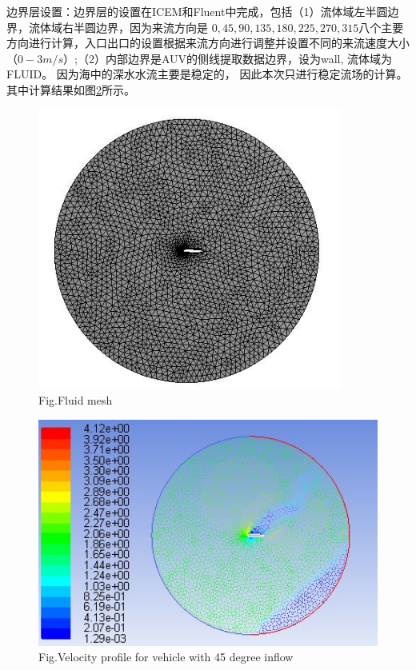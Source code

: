 边界层设置：边界层的设置在ICEM和Fluent中完成，包括（1）流体域左半圆边界，流体域右半圆边界，因为来流方向是 $0, 45, 90, 135, 180, 225, 270,315$八个主要方向进行计算，入口出口的设置根据来流方向进行调整并设置不同的来流速度大小（$0-3 m/s$）;（2）内部边界是AUV的侧线提取数据边界，设为wall, 流体域为FLUID。 因为海中的深水水流主要是稳定的， 因此本次只进行稳定流场的计算。其中计算结果如图\ref{fig:chap3:F12}所示。

    \begin{figure}[!htp]
    \centering
        \includegraphics[width=10cm]{figure/chap3/fig4.jpg}
        \label{fig:chap3:F11}
         {Fig.}{Fluid mesh }
    \end{figure}

    \begin{figure}[!htp]
    \centering
        \includegraphics[width=13cm]{figure/chap3/fig5.jpg}
        \label{fig:chap3:F12}
         {Fig.}{Velocity profile for vehicle with 45 degree inflow }
    \end{figure}

